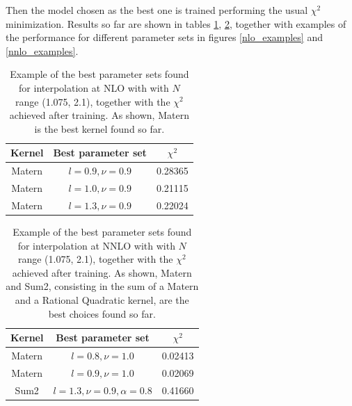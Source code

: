 \documentclass[12pt]{article}
\begin{document}
Then the model chosen as the best one is trained performing the usual $\chi^{2}$ minimization. Results so far are shown in tables \ref{table:hyperopt_NLO}, \ref{table:hyperopt_NNLO}, together with examples of the performance for different parameter sets in figures \ref{nlo_examples} and \ref{nnlo_examples}.

\begin{table}
	\centering
	\vspace{0.5cm}
	\begin{tabular}{|c|c|c|}
		\hline
		Kernel & Best parameter set & $\chi^{2}$ \\
		\hline
		Matern & $l = 0.9, \nu = 0.9$ & 0.28365 \\
		\hline
		Matern & $l = 1.0, \nu = 0.9$ & 0.21115 \\
		\hline
		Matern & $l = 1.3, \nu = 0.9$ & 0.22024 \\
		\hline
	\end{tabular}
	\caption{Example of the best parameter sets found for interpolation at NLO with with $N$ range (1.075, 2.1), together with the $\chi^{2}$ achieved after training. As shown, Matern is the best kernel found so far.}
	\label{table:hyperopt_NLO} 
\end{table}

\begin{table}
	\centering
	\vspace{0.5cm}
	\begin{tabular}{|c|c|c|}
		\hline
		Kernel & Best parameter set & $\chi^{2}$ \\
		\hline
		Matern & $l = 0.8, \nu = 1.0$ & 0.02413 \\
		\hline
		Matern & $l = 0.9, \nu = 1.0$ & 0.02069 \\
		\hline
		Sum2 & $l = 1.3, \nu = 0.9,\alpha = 0.8$ & 0.41660 \\
		\hline
	\end{tabular}
	\caption{Example of the best parameter sets found for interpolation at NNLO with with $N$ range (1.075, 2.1), together with the $\chi^{2}$ achieved after training. As shown, Matern and Sum2, consisting in the sum of a Matern and a Rational Quadratic kernel, are the best choices found so far.}
	\label{table:hyperopt_NNLO}
\end{table}

\newpage
\end{document}
